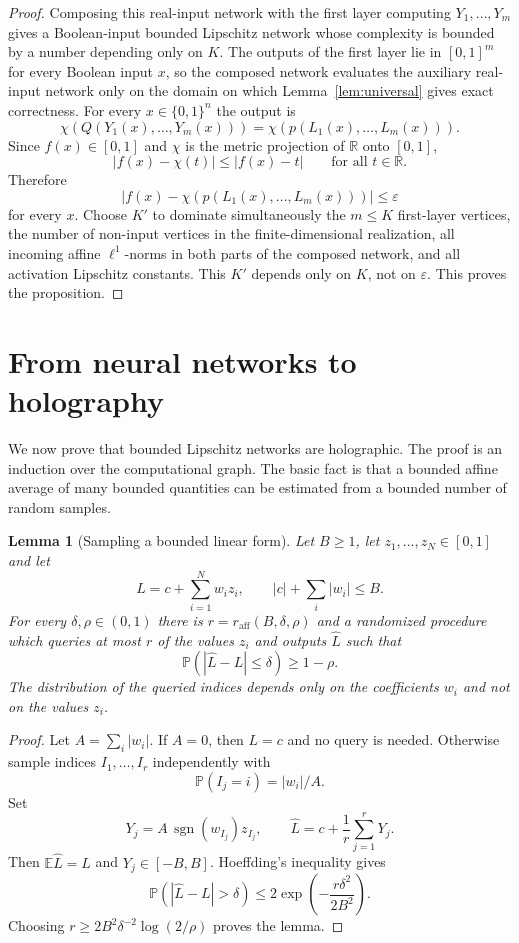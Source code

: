 \documentclass[11pt]{amsart}
\newtheorem{lemma}[theorem]{Lemma}
\newcommand{\E}{\mathbb E}
\newcommand{\Pp}{\mathbb P}
\newcommand{\R}{\mathbb R}
\newcommand{\1}{\mathbf 1}
\newcommand{\cube}{\{0,1\}}
\newcommand{\abs}[1]{\left\lvert #1\right\rvert}
\begin{document}
\begin{proof}
Composing this real-input network with the first layer computing $Y_1,\ldots,Y_m$ gives a Boolean-input bounded Lipschitz network whose complexity is bounded by a number depending only on $K$.  The outputs of the first layer lie in $[0,1]^m$ for every Boolean input $x$, so the composed network evaluates the auxiliary real-input network only on the domain on which Lemma~\ref{lem:universal} gives exact correctness.  For every $x\in\cube^n$ the output is
\[
        \chi(Q(Y_1(x),\ldots,Y_m(x)))
        =
        \chi(p(L_1(x),\ldots,L_m(x))).
\]
Since $f(x)\in[0,1]$ and $\chi$ is the metric projection of $\R$ onto $[0,1]$,
\[
        \abs{f(x)-\chi(t)}\leq \abs{f(x)-t}
        \qquad\text{for all }t\in\R.
\]
Therefore
\[
        \abs{f(x)-\chi(p(L_1(x),\ldots,L_m(x)))}\leq\varepsilon
\]
for every $x$. Choose $K'$ to dominate simultaneously the $m\leq K$ first-layer vertices, the number of non-input vertices in the finite-dimensional realization, all incoming affine $\ell^1$-norms in both parts of the composed network, and all activation Lipschitz constants.  This $K'$ depends only on $K$, not on $\varepsilon$.  This proves the proposition.
\end{proof}

\section{From neural networks to holography}

We now prove that bounded Lipschitz networks are holographic.  The proof is an induction over the computational graph.  The basic fact is that a bounded affine average of many bounded quantities can be estimated from a bounded number of random samples.

\begin{lemma}[Sampling a bounded linear form]\label{lem:sample-affine}
Let $B\geq1$, let $z_1,\ldots,z_N\in[0,1]$ and let
\[
        L=c+\sum_{i=1}^N w_i z_i,
        \qquad
        \abs c+\sum_i\abs{w_i}\leq B.
\]
For every $\delta,\rho\in(0,1)$ there is $r=r_{\mathrm{aff}}(B,\delta,\rho)$ and a randomized procedure which queries at most $r$ of the values $z_i$ and outputs $\widehat L$ such that
\[
        \Pp(\abs{\widehat L-L}\leq\delta)\geq1-\rho.
\]
The distribution of the queried indices depends only on the coefficients $w_i$ and not on the values $z_i$.
\end{lemma}

\begin{proof}
Let $A=\sum_i\abs{w_i}$.  If $A=0$, then $L=c$ and no query is needed.  Otherwise sample indices $I_1,\ldots,I_r$ independently with
\[
        \Pp(I_j=i)=\abs{w_i}/A.
\]
Set
\[
        Y_j=A\,\operatorname{sgn}(w_{I_j})z_{I_j},
        \qquad
        \widehat L=c+\frac1r\sum_{j=1}^rY_j.
\]
Then $\E\widehat L=L$ and $Y_j\in[-B,B]$.  Hoeffding's inequality gives
\[
        \Pp(\abs{\widehat L-L}>\delta)\leq2\exp\left(-\frac{r\delta^2}{2B^2}\right).
\]
Choosing $r\geq2B^2\delta^{-2}\log(2/\rho)$ proves the lemma.
\end{proof}
\end{document}
